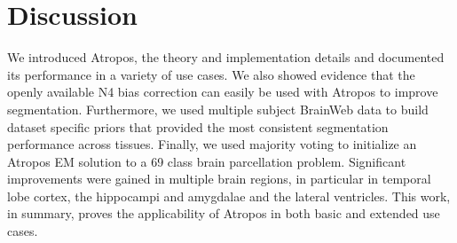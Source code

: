 \documentclass[11pt,english]{article}
\begin{document}
\section{Discussion}
We introduced Atropos, the theory and implementation
details and documented its performance in a variety of use cases.  We
also showed evidence that the openly available N4 bias correction can
easily be used with Atropos to improve segmentation.
Furthermore, we used multiple subject BrainWeb data to build dataset
specific priors that provided the most consistent segmentation
performance across tissues.  Finally, we used majority voting to
initialize an Atropos EM solution to a 69 class brain parcellation
problem.  Significant improvements were gained in multiple brain
regions, in particular in temporal lobe cortex, the hippocampi and
amygdalae and the lateral ventricles.  This work, in summary, proves
the applicability of Atropos in both basic and extended use cases.
\end{document}
